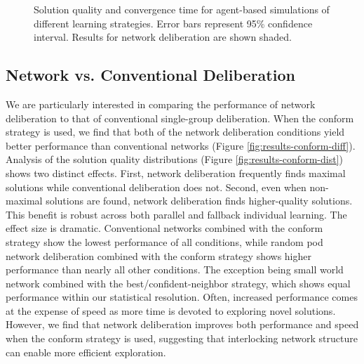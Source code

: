 \begin{figure}[]
\begin{minipage}{1.875in}
    \end{minipage}
\caption{
Solution quality and convergence time for agent-based simulations of different learning strategies. Error bars represent 95\% confidence interval. Results for network deliberation are shown shaded.
}
\end{figure}

\subsection{Network vs. Conventional Deliberation}
We are particularly interested in comparing the performance of network deliberation to that of conventional single-group deliberation. When the conform strategy is used, we find that both of the network deliberation conditions yield better performance than conventional networks (Figure \ref{fig:results-conform-diff}). Analysis of the solution quality distributions (Figure \ref{fig:results-conform-dist}) shows two distinct effects. First, network deliberation frequently finds maximal solutions while conventional deliberation does not. Second, even when non-maximal solutions are found, network deliberation finds higher-quality solutions. This benefit is robust across both parallel and fallback individual learning. The effect size is dramatic. Conventional networks combined with the conform strategy show the lowest performance of all conditions, while random pod network deliberation combined with the conform strategy shows higher performance than nearly all other conditions. The exception being small world network combined with the best/confident-neighbor strategy, which shows equal performance within our statistical resolution. 
Often, increased performance comes at the expense of speed as more time is devoted to exploring novel solutions. However, we find that network deliberation improves both performance and speed when the conform strategy is used, suggesting that interlocking network structure can enable more efficient exploration.

